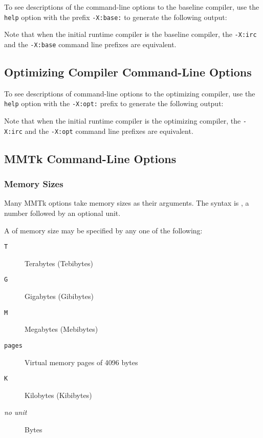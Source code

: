 To see descriptions of the command-line options to the baseline
compiler, use the {\tt help} option with the prefix {\tt -X:base:} 
to generate the following output:

\T \begin{small}

\T \end{small}
 
Note that when the initial runtime compiler is the baseline compiler, 
the {\tt -X:irc} and the {\tt -X:base} command line prefixes are equivalent.

%
\subsection{Optimizing Compiler Command-Line Options}
\label{section:nonadaptive:optimizing:options}

To see descriptions of command-line options to the optimizing compiler,
use the {\tt help} option with the {\tt -X:opt:} prefix 
to generate the following output:

\T \begin{tiny}

\T \end{tiny}

Note that when the initial runtime compiler is the optimizing compiler, 
the {\tt -X:irc} and the {\tt -X:opt} command line prefixes are equivalent.

%
\subsection{MMTk Command-Line Options}%
\label{section:mmtkoptions}%

\subsubsection{Memory Sizes}

Many MMTk options take memory sizes as their arguments.  The syntax is
  \Mlsq{}\Mrsq{}, a number followed by an
  optional unit.

  A  of memory size may be specified by any
      one of the following: 
      \begin{description}
      \item[\texttt{T}] Terabytes (Tebibytes)
      \item[\texttt{G}] Gigabytes (Gibibytes)
      \item[\texttt{M}] Megabytes (Mebibytes)
      \item[\texttt{pages}] Virtual memory pages of 4096 bytes
      \item[\texttt{K}] Kilobytes (Kibibytes)
      \item[\textit{no unit}] Bytes
      \end{description}

